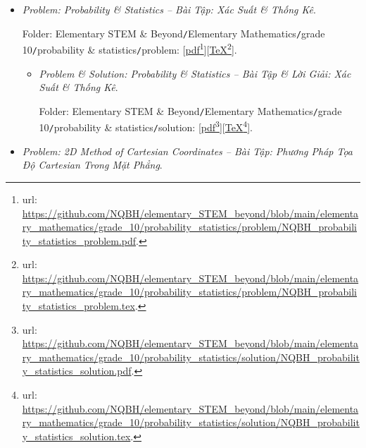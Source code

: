 \documentclass[12pt]{article}
\begin{document}
\begin{itemize}
\begin{itemize}
		Folder: {\sf Elementary STEM \& Beyond{\tt/}Elementary Mathematics{\tt/}grade 10{\tt/}combinatorics{\tt/}solution}: [\href{https://github.com/NQBH/elementary_STEM_beyond/blob/main/elementary_mathematics/grade_10/combinatorics/solution/NQBH_combinatorics_solution.pdf}{pdf}\footnote{{\sc url}: \url{https://github.com/NQBH/elementary_STEM_beyond/blob/main/elementary_mathematics/grade_10/combinatorics/solution/NQBH_combinatorics_solution.pdf}.}][\href{https://github.com/NQBH/elementary_STEM_beyond/blob/main/elementary_mathematics/grade_10/combinatorics/solution/NQBH_combinatorics_solution.tex}{\TeX}\footnote{{\sc url}: \url{https://github.com/NQBH/elementary_STEM_beyond/blob/main/elementary_mathematics/grade_10/combinatorics/solution/NQBH_combinatorics_solution.tex}.}].
	\end{itemize}
	\item {\it Problem: Probability \& Statistics -- Bài Tập: Xác Suất \& Thống Kê}.
	
	Folder: {\sf Elementary STEM \& Beyond{\tt/}Elementary Mathematics{\tt/}grade 10{\tt/}probability \& statistics{\tt/}problem}: [\href{https://github.com/NQBH/elementary_STEM_beyond/blob/main/elementary_mathematics/grade_10/probability_statistics/problem/NQBH_probability_statistics_problem.pdf}{pdf}\footnote{{\sc url}: \url{https://github.com/NQBH/elementary_STEM_beyond/blob/main/elementary_mathematics/grade_10/probability_statistics/problem/NQBH_probability_statistics_problem.pdf}.}][\href{https://github.com/NQBH/elementary_STEM_beyond/blob/main/elementary_mathematics/grade_10/probability_statistics/problem/NQBH_probability_statistics_problem.tex}{\TeX}\footnote{{\sc url}: \url{https://github.com/NQBH/elementary_STEM_beyond/blob/main/elementary_mathematics/grade_10/probability_statistics/problem/NQBH_probability_statistics_problem.tex}.}].
	\begin{itemize}
		\item {\it Problem \& Solution: Probability \& Statistics -- Bài Tập \& Lời Giải: Xác Suất \& Thống Kê}.
		
		Folder: {\sf Elementary STEM \& Beyond{\tt/}Elementary Mathematics{\tt/}grade 10{\tt/}probability \& statistics{\tt/}solution}: [\href{https://github.com/NQBH/elementary_STEM_beyond/blob/main/elementary_mathematics/grade_10/probability_statistics/solution/NQBH_probability_statistics_solution.pdf}{pdf}\footnote{{\sc url}: \url{https://github.com/NQBH/elementary_STEM_beyond/blob/main/elementary_mathematics/grade_10/probability_statistics/solution/NQBH_probability_statistics_solution.pdf}.}][\href{https://github.com/NQBH/elementary_STEM_beyond/blob/main/elementary_mathematics/grade_10/probability_statistics/solution/NQBH_probability_statistics_solution.tex}{\TeX}\footnote{{\sc url}: \url{https://github.com/NQBH/elementary_STEM_beyond/blob/main/elementary_mathematics/grade_10/probability_statistics/solution/NQBH_probability_statistics_solution.tex}.}].
	\end{itemize}
	\item {\it Problem: 2D Method of Cartesian Coordinates -- Bài Tập: Phương Pháp Tọa Độ Cartesian Trong Mặt Phẳng}.
	

\end{itemize}
\end{document}
